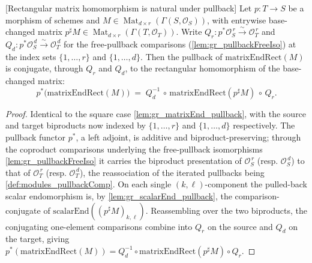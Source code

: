 \begin{lemma}

[Rectangular matrix homomorphism is natural under pullback]
  \label{lem:gr_matrixEndRect_pullback}
  Let \(p : T \to S\) be a morphism of schemes and
  \(M \in \operatorname{Mat}_{d\times r}(\Gamma(S,\mathcal{O}_S))\), with entrywise
  base-changed matrix \(p^{\sharp}M \in \operatorname{Mat}_{d\times r}(\Gamma(T,\mathcal{O}_T))\).
  Write \(Q_r : p^{*}\mathcal{O}_S^{\,r} \xrightarrow{\sim} \mathcal{O}_T^{\,r}\) and
  \(Q_d : p^{*}\mathcal{O}_S^{\,d} \xrightarrow{\sim} \mathcal{O}_T^{\,d}\) for the
  free-pullback comparisons (\cref{lem:gr_pullbackFreeIso}) at the index sets
  \(\{1,\dots,r\}\) and \(\{1,\dots,d\}\). Then the pullback of
  \(\mathrm{matrixEndRect}(M)\) is conjugate, through \(Q_r\) and \(Q_d\), to the
  rectangular homomorphism of the base-changed matrix:
  \[
    p^{*}\bigl(\mathrm{matrixEndRect}(M)\bigr)
      \;=\; Q_d^{-1} \,\circ\, \mathrm{matrixEndRect}(p^{\sharp}M) \,\circ\, Q_r .
  \]
\end{lemma}
\begin{proof}
  Identical to the square case \cref{lem:gr_matrixEnd_pullback}, with the source and target
  biproducts now indexed by \(\{1,\dots,r\}\) and \(\{1,\dots,d\}\) respectively. The
  pullback functor \(p^{*}\), a left adjoint, is additive and biproduct-preserving; through
  the coproduct comparisons underlying the free-pullback isomorphisms
  \cref{lem:gr_pullbackFreeIso} it carries the biproduct presentation of
  \(\mathcal{O}_S^{\,r}\) (resp. \(\mathcal{O}_S^{\,d}\)) to that of \(\mathcal{O}_T^{\,r}\)
  (resp. \(\mathcal{O}_T^{\,d}\)), the reassociation of the iterated pullbacks being
  \cref{def:modules_pullbackComp}. On each single \((k,\ell)\)-component the pulled-back
  scalar endomorphism is, by \cref{lem:gr_scalarEnd_pullback}, the comparison-conjugate of
  \(\mathrm{scalarEnd}((p^{\sharp}M)_{k,\ell})\). Reassembling over the two biproducts, the
  conjugating one-element comparisons combine into \(Q_r\) on the source and \(Q_d\) on the
  target, giving \(p^{*}(\mathrm{matrixEndRect}(M)) = Q_d^{-1}\circ
  \mathrm{matrixEndRect}(p^{\sharp}M)\circ Q_r\).
\end{proof}


